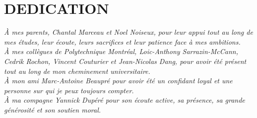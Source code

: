 \chapter*{DEDICATION}\thispagestyle{headings}
\begin{flushright}
  \itshape
  À mes parents, Chantal Marceau et Noel Noiseux, pour leur appui tout au long de mes études, leur écoute, leurs sacrifices et leur patience face à mes ambitions.\\
  À mes collègues de Polytechnique Montréal, Loic-Anthony Sarrazin-McCann, Cedrik Rochon, Vincent Couturier et Jean-Nicolas Dang, pour avoir été présent tout au long de mon cheminement universitaire.\\
  À mon ami Marc-Antoine Beaupré pour avoir été un confidant loyal et une personne sur qui je peux toujours compter.\\
  À ma compagne Yannick Dupéré pour son écoute active, sa présence, sa grande générosité et son soutien moral.
\end{flushright}

